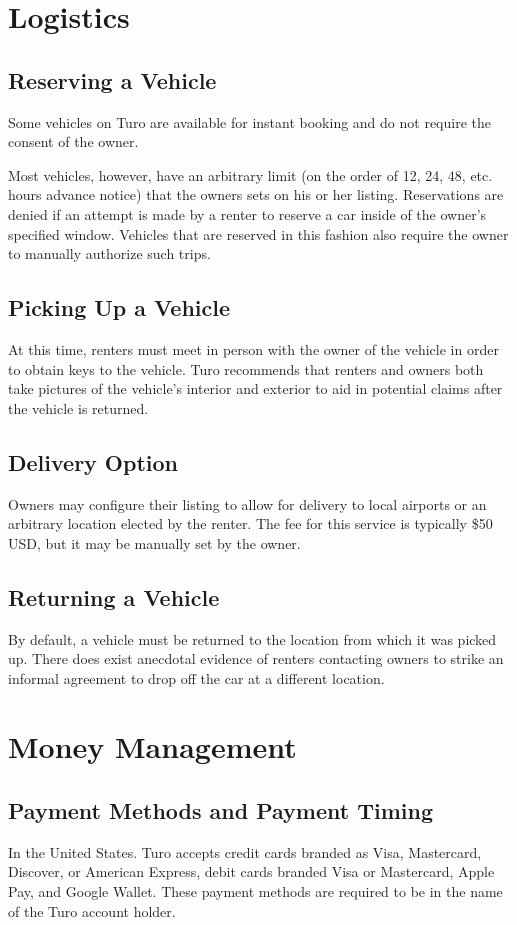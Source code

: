\documentclass[review,12pt]{elsarticle}
\begin{document}
\section{Logistics}
  \subsection{Reserving a Vehicle}
  Some vehicles on Turo are available for instant booking and do not require the consent of the owner.

  Most vehicles, however, have an arbitrary limit (on the order of 12, 24, 48, etc. hours advance notice) that the owners sets on his or her listing. Reservations are denied if an attempt is made by a renter to reserve a car inside of the owner's specified window. Vehicles that are reserved in this fashion also require the owner to manually authorize such trips.

  \subsection{Picking Up a Vehicle}
  At this time, renters must meet in person with the owner of the vehicle in order to obtain keys to the vehicle. Turo recommends that renters and owners both take pictures of the vehicle's interior and exterior to aid in potential claims after the vehicle is returned.

  \subsection{Delivery Option}
  Owners may configure their listing to allow for delivery to local airports or an arbitrary location elected by the renter. The fee for this service is typically \$50 USD, but it may be manually set by the owner.

  \subsection{Returning a Vehicle}
  By default, a vehicle must be returned to the location from which it was picked up. There does exist anecdotal evidence of renters contacting owners to strike an informal agreement to drop off the car at a different location.

\section{Money Management}

  \subsection{Payment Methods and Payment Timing}
  In the United States. Turo accepts credit cards branded as Visa, Mastercard, Discover, or American Express, debit cards branded Visa or Mastercard, Apple Pay, and Google Wallet. These payment methods are required to be in the name of the Turo account holder.
\end{document}
